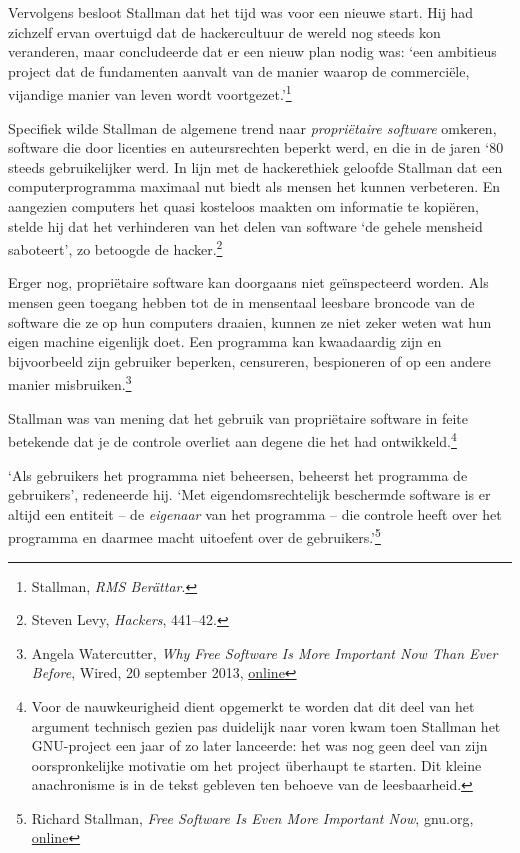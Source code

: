 \documentclass[
  a5paper,
  smalldemyvopaper,11pt,twoside,onecolumn,openright,extrafontsizes,
hidelinks]{memoir}
\begin{document}
Vervolgens besloot Stallman dat het tijd was voor een nieuwe start. Hij
had zichzelf ervan overtuigd dat de hackercultuur de wereld nog steeds
kon veranderen, maar concludeerde dat er een nieuw plan nodig was: `een
ambitieus project dat de fundamenten aanvalt van de manier waarop de
commerciële, vijandige manier van leven wordt voortgezet.'\footnote{\hspace{0pt}Stallman,
  \emph{RMS Berättar}.}

Specifiek wilde Stallman de algemene trend naar \emph{propriëtaire
software} omkeren, software die door licenties en auteursrechten beperkt
werd, en die in de jaren `80 steeds gebruikelijker werd. In lijn met de
hackerethiek geloofde Stallman dat een computerprogramma maximaal nut
biedt als mensen het kunnen verbeteren. En aangezien computers het quasi
kosteloos maakten om informatie te kopiëren, stelde hij dat het
verhinderen van het delen van software `de gehele mensheid saboteert',
zo betoogde de hacker.\footnote{\hspace{0pt}Steven Levy, \emph{Hackers},
  441--42.}

Erger nog, propriëtaire software kan doorgaans niet geïnspecteerd
worden. Als mensen geen toegang hebben tot de in mensentaal leesbare
broncode van de software die ze op hun computers draaien, kunnen ze niet
zeker weten wat hun eigen machine eigenlijk doet. Een programma kan
kwaadaardig zijn en bijvoorbeeld zijn gebruiker beperken, censureren,
bespioneren of op een andere manier misbruiken.\footnote{\hspace{0pt}Angela
  Watercutter, \emph{Why Free Software Is More Important Now Than Ever
  Before}, Wired, 20 september 2013,
  \href{https://www.wired.com/2013/09/why-free-software-is-more-important-now-than-ever-before/}{online}}

Stallman was van mening dat het gebruik van propriëtaire software in
feite betekende dat je de controle overliet aan degene die het had
ontwikkeld.\footnote{Voor de nauwkeurigheid dient opgemerkt te worden
  dat dit deel van het argument technisch gezien pas duidelijk naar
  voren kwam toen Stallman het GNU-project een jaar of zo later
  lanceerde: het was nog geen deel van zijn oorspronkelijke motivatie om
  het project überhaupt te starten. Dit kleine anachronisme is in de
  tekst gebleven ten behoeve van de leesbaarheid.}

`Als gebruikers het programma niet beheersen, beheerst het programma de
gebruikers', redeneerde hij. `Met eigendomsrechtelijk beschermde
software is er altijd een entiteit -- de \emph{eigenaar} van het
programma -- die controle heeft over het programma en daarmee macht
uitoefent over de gebruikers.'\footnote{\hspace{0pt}Richard Stallman,
  \emph{Free Software Is Even More Important Now}, gnu.org,
  \href{https://www.gnu.org/philosophy/free-software-even-more-important.en.html}{online}}
\end{document}
